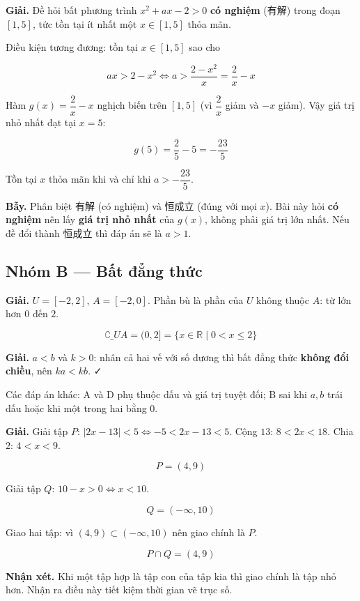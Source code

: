 \documentclass[11pt, a4paper]{article}
\begin{document}
\begin{dapan}[25 — Đáp án A]
\textbf{Giải.} Đề hỏi bất phương trình $x^2 + ax - 2 > 0$ \textbf{có nghiệm} (有解) trong đoạn $[1, 5]$, tức tồn tại ít nhất một $x \in [1,5]$ thỏa mãn.

Điều kiện tương đương: tồn tại $x \in [1,5]$ sao cho

$$ax > 2 - x^2 \iff a > \frac{2 - x^2}{x} = \frac{2}{x} - x$$

Hàm $g(x) = \dfrac{2}{x} - x$ nghịch biến trên $[1,5]$ (vì $\dfrac{2}{x}$ giảm và $-x$ giảm). Vậy giá trị nhỏ nhất đạt tại $x = 5$:

$$g(5) = \frac{2}{5} - 5 = -\frac{23}{5}$$

Tồn tại $x$ thỏa mãn khi và chỉ khi $a > -\dfrac{23}{5}$.

\textbf{Bẫy.} Phân biệt 有解 (có nghiệm) và 恒成立 (đúng với mọi $x$). Bài này hỏi \textbf{có nghiệm} nên lấy \textbf{giá trị nhỏ nhất} của $g(x)$, không phải giá trị lớn nhất. Nếu đề đổi thành 恒成立 thì đáp án sẽ là $a > 1$.
\end{dapan}

\subsection*{Nhóm B — Bất đẳng thức}

\begin{dapan}[1 — Đáp án C]
\textbf{Giải.} $U = [-2, 2]$, $A = [-2, 0]$. Phần bù là phần của $U$ không thuộc $A$: từ lớn hơn $0$ đến $2$.

$$\complement\_U A = (0, 2] = \{x \in \mathbb{R} \mid 0 < x \le 2\}$$
\end{dapan}

\begin{dapan}[2 — Đáp án C]
\textbf{Giải.} $a < b$ và $k > 0$: nhân cả hai vế với số dương thì bất đẳng thức \textbf{không đổi chiều}, nên $ka < kb$. ✓

Các đáp án khác: A và D phụ thuộc dấu và giá trị tuyệt đối; B sai khi $a, b$ trái dấu hoặc khi một trong hai bằng $0$.
\end{dapan}

\begin{dapan}[3 — Đáp án A]
\textbf{Giải.} Giải tập $P$: $|2x - 13| < 5 \iff -5 < 2x - 13 < 5$. Cộng $13$: $8 < 2x < 18$. Chia $2$: $4 < x < 9$.

$$P = (4, 9)$$

Giải tập $Q$: $10 - x > 0 \iff x < 10$.

$$Q = (-\infty, 10)$$

Giao hai tập: vì $(4,9) \subset (-\infty, 10)$ nên giao chính là $P$.

$$P \cap Q = (4, 9)$$

\textbf{Nhận xét.} Khi một tập hợp là tập con của tập kia thì giao chính là tập nhỏ hơn. Nhận ra điều này tiết kiệm thời gian vẽ trục số.
\end{dapan}
\end{document}
